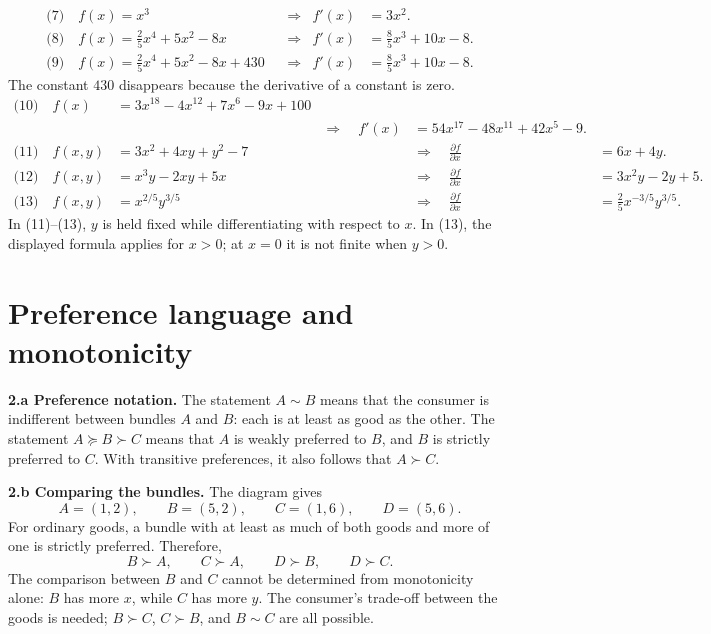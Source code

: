 \documentclass[11pt,a4paper]{article}
\begin{document}
\begin{align*}
\text{(7)}\quad f(x)=x^3
&&\Longrightarrow& f'(x)&=\boxed{3x^2}.\\[0.3em]
\text{(8)}\quad f(x)=\frac25x^4+5x^2-8x
&&\Longrightarrow& f'(x)&=\boxed{\frac85x^3+10x-8}.\\[0.3em]
\text{(9)}\quad f(x)=\frac25x^4+5x^2-8x+430
&&\Longrightarrow& f'(x)&=\boxed{\frac85x^3+10x-8}.
\end{align*}
The constant \(430\) disappears because the derivative of a constant is zero.
\begin{align*}
\text{(10)}\quad f(x)&=3x^{18}-4x^{12}+7x^6-9x+100\\
&&\Longrightarrow\quad f'(x)&=\boxed{54x^{17}-48x^{11}+42x^5-9}.\\[0.3em]
\text{(11)}\quad f(x,y)&=3x^2+4xy+y^2-7
&&\Longrightarrow\quad \frac{\partial f}{\partial x}
  &=\boxed{6x+4y}.\\[0.3em]
\text{(12)}\quad f(x,y)&=x^3y-2xy+5x
&&\Longrightarrow\quad \frac{\partial f}{\partial x}
  &=\boxed{3x^2y-2y+5}.\\[0.3em]
\text{(13)}\quad f(x,y)&=x^{2/5}y^{3/5}
&&\Longrightarrow\quad \frac{\partial f}{\partial x}
  &=\boxed{\frac25x^{-3/5}y^{3/5}}.
\end{align*}
In (11)--(13), \(y\) is held fixed while differentiating with respect to
\(x\). In (13), the displayed formula applies for \(x>0\); at \(x=0\) it
is not finite when \(y>0\).

\section{Preference language and monotonicity}

\textbf{2.a Preference notation.} The statement \(A\sim B\) means that the
consumer is indifferent between bundles \(A\) and \(B\): each is at least as
good as the other. The statement \(A\succeq B\succ C\) means that \(A\) is
weakly preferred to \(B\), and \(B\) is strictly preferred to \(C\). With
transitive preferences, it also follows that \(A\succ C\).

\textbf{2.b Comparing the bundles.} The diagram gives
\[
  A=(1,2),\qquad B=(5,2),\qquad C=(1,6),\qquad D=(5,6).
\]
For ordinary goods, a bundle with at least as much of both goods and more of
one is strictly preferred. Therefore,
\[
  \boxed{B\succ A,\qquad C\succ A,\qquad D\succ B,\qquad D\succ C.}
\]
The comparison between \(B\) and \(C\) cannot be determined from monotonicity
alone: \(B\) has more \(x\), while \(C\) has more \(y\). The consumer's
trade-off between the goods is needed; \(B\succ C\), \(C\succ B\), and
\(B\sim C\) are all possible.
\end{document}
